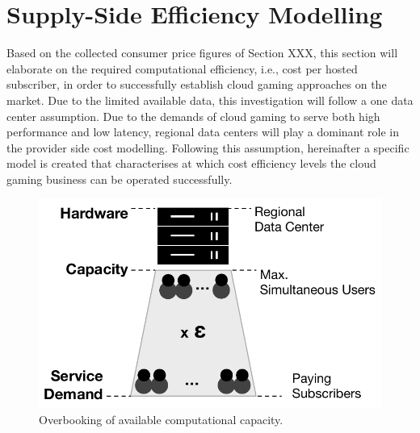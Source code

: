 
\section{Supply-Side Efficiency Modelling} %
\label{sec:suppliermodelling}



Based on the collected consumer price figures of Section XXX, this section will elaborate on the required computational efficiency, i.e., cost per hosted subscriber, in order to successfully establish cloud gaming approaches on the market. Due to the limited available data, this investigation will follow a one data center assumption. Due to the demands of cloud gaming to serve both high performance and low latency, regional data centers will play a dominant role in the provider side cost modelling. Following this assumption, hereinafter a specific model is created that characterises at which cost efficiency levels the cloud gaming business can be operated successfully.

\begin{figure}[!t]
	\centering
	\includegraphics[width=0.65\columnwidth]{images/overbooking_datacenter.pdf}
	\caption{Overbooking of available computational capacity.}
\label{fig:overbooking_datacenter}
\end{figure}

